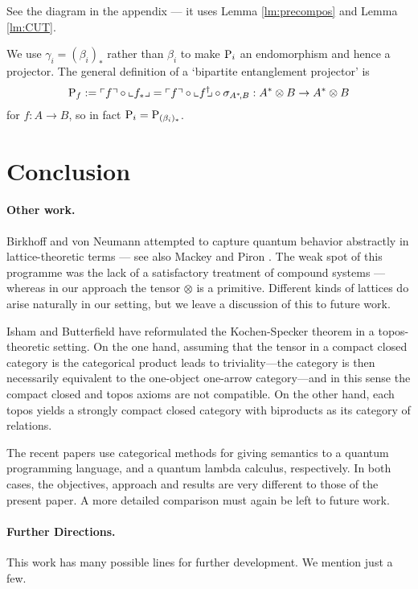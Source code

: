\documentclass[10pt]{article}
\begin{document}
\bpf
See the diagram in the appendix --- it uses Lemma \ref{lm:precompos} and Lemma \ref{lm:CUT}. 
\hfill\endproof\newline 

We use $\gamma_i=(\beta_i)_*$ rather than $\beta_i$ to make ${\rm
 P}_i$ an endomorphism and hence a projector. 
The general definition of a `bipartite entanglement projector' is
\[
\hspace{-1.5mm}{\rm P}_f:=\ulcorner f\urcorner\circ\llcorner f_*\lrcorner=\ulcorner
f\urcorner\circ\llcorner f^\dagger\!\!\lrcorner\circ \sigma_{A^*\!, B}:A^*\otimes B\to A^*\otimes
B\hspace{-1.5mm}
\]
for $f:A\to B$, so in fact ${\rm P}_i={\rm P}_{(\beta_i)_*}$.

\section{Conclusion}  

\paragraph{Other work.}
Birkhoff and von Neumann
\cite{BvN} attempted to capture quantum behavior abstractly in
lattice-theoretic terms --- see also Mackey \cite{Mackey} and
Piron \cite{Piron}.   The weak spot of this programme was 
the lack of a satisfactory treatment of compound systems --- whereas in our
approach the tensor $\otimes$ is a primitive.  Different kinds
of lattices do arise naturally in our setting, but we leave a discussion
of this to future work.

Isham and Butterfield \cite{IshBut} have reformulated the
Kochen-Specker theorem in a topos-theoretic setting.  On the one hand, 
assuming that the tensor in a compact closed category is the
categorical product leads to triviality---the category is then
necessarily equivalent to the one-object one-arrow category---and in
this sense the compact closed and topos axioms are not compatible.  On the other hand, each
topos yields a strongly compact closed category with biproducts
as its category of relations.

The recent papers \cite{Sel,vTon} use categorical methods for giving 
semantics to a quantum programming language, and a quantum lambda
calculus, respectively. In both cases, the objectives, approach and
results are very different to those of the present paper. A more
detailed comparison must again be left to future work.

\paragraph{Further Directions.} This work has many possible lines for further
development. We mention just a few.
\end{document}
